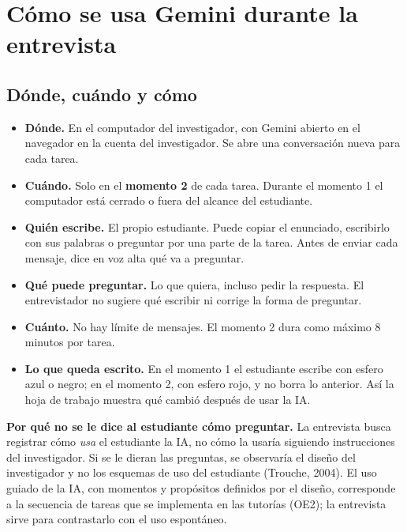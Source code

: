 \documentclass[11pt,letterpaper]{article}
\newcounter{preg}
\begin{document}
\section{Cómo se usa Gemini durante la entrevista}\label{sec:usoia}

\subsection{Dónde, cuándo y cómo}
\begin{itemize}
  \item \textbf{Dónde.} En el computador del investigador, con Gemini abierto en el navegador en la cuenta del investigador. Se abre una conversación nueva para cada tarea.
  \item \textbf{Cuándo.} Solo en el \textbf{momento 2} de cada tarea. Durante el momento 1 el computador está cerrado o fuera del alcance del estudiante.
  \item \textbf{Quién escribe.} El propio estudiante. Puede copiar el enunciado, escribirlo con sus palabras o preguntar por una parte de la tarea. Antes de enviar cada mensaje, dice en voz alta qué va a preguntar.
  \item \textbf{Qué puede preguntar.} Lo que quiera, incluso pedir la respuesta. El entrevistador no sugiere qué escribir ni corrige la forma de preguntar.
  \item \textbf{Cuánto.} No hay límite de mensajes. El momento 2 dura como máximo 8 minutos por tarea.
  \item \textbf{Lo que queda escrito.} En el momento 1 el estudiante escribe con esfero azul o negro; en el momento 2, con esfero rojo, y no borra lo anterior. Así la hoja de trabajo muestra qué cambió después de usar la IA.
\end{itemize}

\noindent\textbf{Por qué no se le dice al estudiante cómo preguntar.} La entrevista busca registrar cómo \emph{usa} el estudiante la IA, no cómo la usaría siguiendo instrucciones del investigador. Si se le dieran las preguntas, se observaría el diseño del investigador y no los esquemas de uso del estudiante (Trouche, 2004). El uso guiado de la IA, con momentos y propósitos definidos por el diseño, corresponde a la secuencia de tareas que se implementa en las tutorías (OE2); la entrevista sirve para contrastarlo con el uso espontáneo.
\end{document}
